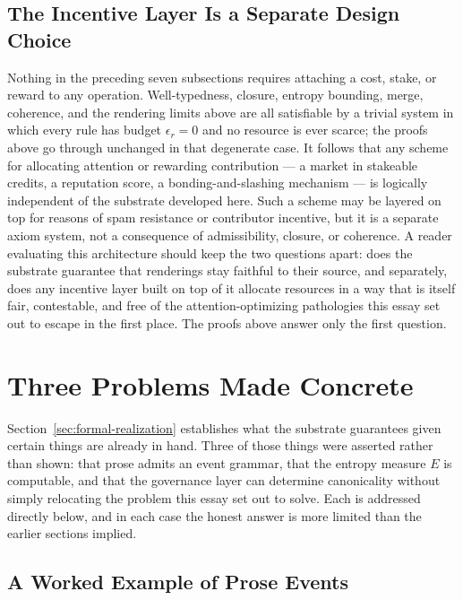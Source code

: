 \documentclass[11pt]{article}
\theoremstyle{definition}
\begin{document}
\subsection{The Incentive Layer Is a Separate Design Choice}
\label{sec:incentive-layer}

Nothing in the preceding seven subsections requires attaching a cost, stake, or reward to any operation. Well-typedness, closure, entropy bounding, merge, coherence, and the rendering limits above are all satisfiable by a trivial system in which every rule has budget $\epsilon_r = 0$ and no resource is ever scarce; the proofs above go through unchanged in that degenerate case. It follows that any scheme for allocating attention or rewarding contribution --- a market in stakeable credits, a reputation score, a bonding-and-slashing mechanism --- is logically independent of the substrate developed here. Such a scheme may be layered on top for reasons of spam resistance or contributor incentive, but it is a separate axiom system, not a consequence of admissibility, closure, or coherence. A reader evaluating this architecture should keep the two questions apart: does the substrate guarantee that renderings stay faithful to their source, and separately, does any incentive layer built on top of it allocate resources in a way that is itself fair, contestable, and free of the attention-optimizing pathologies this essay set out to escape in the first place. The proofs above answer only the first question.

\section{Three Problems Made Concrete}
\label{sec:three-problems}

Section~\ref{sec:formal-realization} establishes what the substrate guarantees given certain things are already in hand. Three of those things were asserted rather than shown: that prose admits an event grammar, that the entropy measure $E$ is computable, and that the governance layer can determine canonicality without simply relocating the problem this essay set out to solve. Each is addressed directly below, and in each case the honest answer is more limited than the earlier sections implied.

\subsection{A Worked Example of Prose Events}
\label{sec:worked-example}
\end{document}

